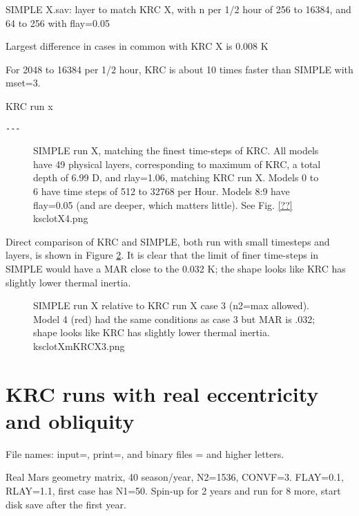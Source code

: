 \documentclass{article}
\begin{document}
SIMPLE  X.sav: layer to match KRC X, with n per 1/2 hour of  256 to 16384,
and 64 to 256 with flay=0.05

Largest difference in cases in common with KRC X is 0.008 K 

For 2048 to 16384 per 1/2 hour, KRC is about 10 times faster than SIMPLE
with mset=3.

\begin{table} \caption[Long runs]{KRC run x} \label{runX}
\begin{verbatim}
---
\end{verbatim}
\vspace{-3.0mm}
\hrulefill \end{table} 

\begin{figure}[!ht] 
\caption[SIMPLE with small timesteps]{SIMPLE run X, matching the finest
  time-steps of KRC. All models have 49 physical layers, corresponding to
  maximum of KRC, a total depth of 6.99 D, and rlay=1.06, matching KRC run
  X. Models 0 to 6 have time steps of 512 to 32768 per Hour. Models 8:9 have
  flay=0.05 (and are deeper, which matters little). See Fig. \ref{??}
\label{ksclotX4} ksclotX4.png }
\end{figure} 

Direct comparison of KRC and SIMPLE, both run with small timesteps and layers,
is shown in Figure \ref{ksclotXmKRCX3}. It is clear that the limit of finer
time-steps in SIMPLE would have a MAR close to the 0.032 K; the shape looks like
KRC has slightly lower thermal inertia.



\begin{figure}[!ht] 
\caption[SIMPLE-KRC]{SIMPLE run X relative to KRC run X case 3 (n2=max
  allowed). Model 4 (red) had the same conditions as case 3 but MAR is .032; shape
  looks like KRC has slightly lower thermal inertia.
\label{ksclotXmKRCX3} ksclotXmKRCX3.png }
\end{figure} 
\clearpage


\section{KRC runs with real eccentricity and obliquity}
File names: input=, print=, and binary files = and higher letters.

Real Mars geometry matrix, 40 season/year, N2=1536, CONVF=3. FLAY=0.1, RLAY=1.1,
 first case has N1=50. Spin-up for 2 years and run for 8 more, start disk save after the first year.  
\end{document}
